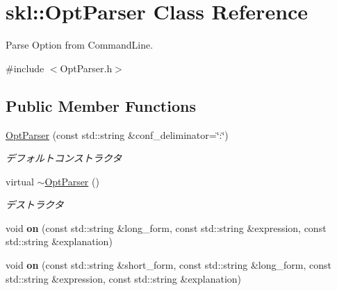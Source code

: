 \hypertarget{classskl_1_1_opt_parser}{}\section{skl\+:\+:Opt\+Parser Class Reference}
\label{classskl_1_1_opt_parser}


Parse Option from Command\+Line.  




{\ttfamily \#include $<$Opt\+Parser.\+h$>$}

\subsection*{Public Member Functions}
\begin{DoxyCompactItemize}
\item 
\hypertarget{classskl_1_1_opt_parser_ab8720ec621a124e68046a31c85405d1d}{}\label{classskl_1_1_opt_parser_ab8720ec621a124e68046a31c85405d1d} 
\hyperlink{classskl_1_1_opt_parser_ab8720ec621a124e68046a31c85405d1d}{Opt\+Parser} (const std\+::string \&conf\+\_\+deliminator=\char`\"{}\+:\char`\"{})
\begin{DoxyCompactList}\small\item\em デフォルトコンストラクタ \end{DoxyCompactList}\item 
\hypertarget{classskl_1_1_opt_parser_afda19cef607451fa8bddeeff1be0f1a2}{}\label{classskl_1_1_opt_parser_afda19cef607451fa8bddeeff1be0f1a2} 
virtual \hyperlink{classskl_1_1_opt_parser_afda19cef607451fa8bddeeff1be0f1a2}{$\sim$\+Opt\+Parser} ()
\begin{DoxyCompactList}\small\item\em デストラクタ \end{DoxyCompactList}\item 
\hypertarget{classskl_1_1_opt_parser_a5b035092633240161519545cca3534a1}{}\label{classskl_1_1_opt_parser_a5b035092633240161519545cca3534a1} 
void {\bfseries on} (const std\+::string \&long\+\_\+form, const std\+::string \&expression, const std\+::string \&explanation)
\item 
\hypertarget{classskl_1_1_opt_parser_aaad7fee81b7d17ffe0672161d61a31cf}{}\label{classskl_1_1_opt_parser_aaad7fee81b7d17ffe0672161d61a31cf} 
void {\bfseries on} (const std\+::string \&short\+\_\+form, const std\+::string \&long\+\_\+form, const std\+::string \&expression, const std\+::string \&explanation)
\item 
\hypertarget{classskl_1_1_opt_parser_aa0cdaff6ce699507675bf17debdb37c1}{}\label{classskl_1_1_opt_parser_aa0cdaff6ce699507675bf17debdb37c1} 

\end{DoxyCompactItemize}

